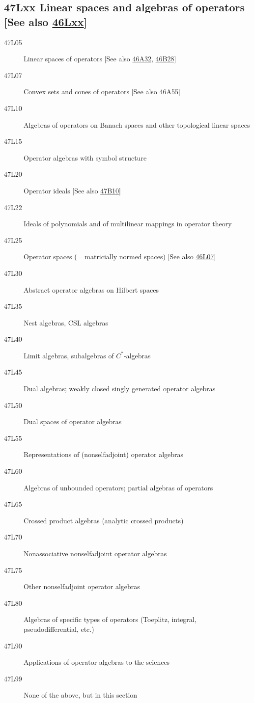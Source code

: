 \documentclass[letterpaper]{article}
\begin{document}
\subsection*{47Lxx  Linear spaces and algebras of operators [See also \hyperref[46Lxx]{46Lxx}] }\label{47Lxx}
\begin{description}  
\item [47L05]\label{47L05} Linear spaces of operators [See also \hyperref[46A32]{46A32}, \hyperref[46B28]{46B28}]
\item [47L07]\label{47L07} Convex sets and cones of operators [See also \hyperref[46A55]{46A55}]
\item [47L10]\label{47L10} Algebras of operators on Banach spaces and other topological linear spaces
\item [47L15]\label{47L15} Operator algebras with symbol structure
\item [47L20]\label{47L20} Operator ideals [See also \hyperref[47B10]{47B10}]
\item [47L22]\label{47L22} Ideals of polynomials and of multilinear mappings in operator theory
\item [47L25]\label{47L25} Operator spaces (= matricially normed spaces) [See also \hyperref[46L07]{46L07}]
\item [47L30]\label{47L30} Abstract operator algebras on Hilbert spaces
\item [47L35]\label{47L35} Nest algebras, CSL algebras
\item [47L40]\label{47L40} Limit algebras, subalgebras of $C^*$-algebras
\item [47L45]\label{47L45} Dual algebras; weakly closed singly generated operator algebras
\item [47L50]\label{47L50} Dual spaces of operator algebras
\item [47L55]\label{47L55} Representations of (nonselfadjoint) operator algebras
\item [47L60]\label{47L60} Algebras of unbounded operators; partial algebras of operators
\item [47L65]\label{47L65} Crossed product algebras (analytic crossed products)
\item [47L70]\label{47L70} Nonassociative nonselfadjoint operator algebras
\item [47L75]\label{47L75} Other nonselfadjoint operator algebras
\item [47L80]\label{47L80} Algebras of specific types of operators (Toeplitz, integral, pseudodifferential, etc.)
\item [47L90]\label{47L90} Applications of operator algebras to the sciences
\item [47L99]\label{47L99} None of the above, but in this section
\end{description}
\end{document}
